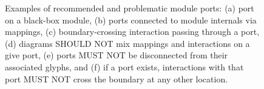 {\begin{enumerate}
	\begin{figure}[h!]
	\centering
	\caption{Examples of recommended and problematic module ports: (a) port on a black-box module, (b) ports connected to module internals via mappings, (c) boundary-crossing interaction passing through a port, (d) diagrams SHOULD NOT mix mappings and interactions on a give port, (e) ports MUST NOT be disconnected from their associated glyphs, and (f) if a port exists, interactions with that port MUST NOT cross the boundary at any other location.}
	\label{exa:moduleD}
	\end{figure}

\end{enumerate}
}

